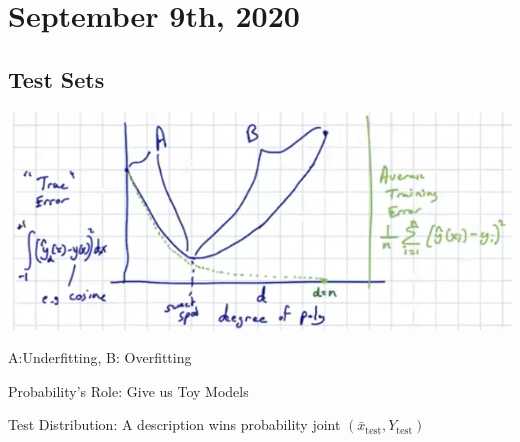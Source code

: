 \documentclass[11pt]{article}
\begin{document}
\newpage
\section{September 9th, 2020}
\subsection{Test Sets}
\begin{center}
    \includegraphics[scale=0.65]{images/9-9-testset.png}
\end{center}
A:Underfitting, B: Overfitting

Probability's Role: Give us Toy Models

Test Distribution: A description wins probability joint $(\bar{x}_{\mathrm{test}}, Y_{\mathrm{test}})$
\end{document}
